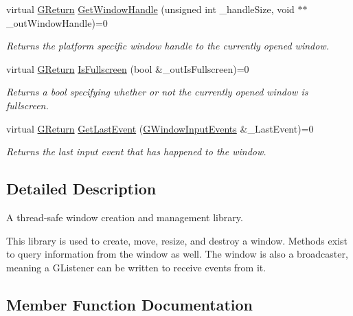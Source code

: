 \begin{DoxyCompactItemize}
virtual \mbox{\hyperlink{namespaceGW_a67a839e3df7ea8a5c5686613a7a3de21}{G\+Return}} \mbox{\hyperlink{classGW_1_1SYSTEM_1_1GWindow_a71b73cc2ba9b010745f0f6171dc8b950}{Get\+Window\+Handle}} (unsigned int \+\_\+handle\+Size, void $\ast$$\ast$\+\_\+out\+Window\+Handle)=0
\begin{DoxyCompactList}\small\item\em Returns the platform specific window handle to the currently opened window. \end{DoxyCompactList}\item 
virtual \mbox{\hyperlink{namespaceGW_a67a839e3df7ea8a5c5686613a7a3de21}{G\+Return}} \mbox{\hyperlink{classGW_1_1SYSTEM_1_1GWindow_a28ae1c50fbd7c1c292ed5aa055cae9a7}{Is\+Fullscreen}} (bool \&\+\_\+out\+Is\+Fullscreen)=0
\begin{DoxyCompactList}\small\item\em Returns a bool specifying whether or not the currently opened window is fullscreen. \end{DoxyCompactList}\item 
virtual \mbox{\hyperlink{namespaceGW_a67a839e3df7ea8a5c5686613a7a3de21}{G\+Return}} \mbox{\hyperlink{classGW_1_1SYSTEM_1_1GWindow_ac5ce407834e1c92b5fe4ffded363ab00}{Get\+Last\+Event}} (\mbox{\hyperlink{namespaceGW_1_1SYSTEM_a7d3a00c7f94541cb6f446fde944ab309}{G\+Window\+Input\+Events}} \&\+\_\+\+Last\+Event)=0
\begin{DoxyCompactList}\small\item\em Returns the last input event that has happened to the window. \end{DoxyCompactList}\end{DoxyCompactItemize}


\subsection{Detailed Description}
A thread-\/safe window creation and management library. 

This library is used to create, move, resize, and destroy a window. Methods exist to query information from the window as well. The window is also a broadcaster, meaning a G\+Listener can be written to receive events from it. 

\subsection{Member Function Documentation}
\mbox{\label{classGW_1_1SYSTEM_1_1GWindow_a21533c58e920d347c377ebdaa6d2b76f}} 
